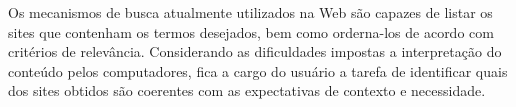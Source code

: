 
Os mecanismos de busca atualmente utilizados na Web são capazes de listar os sites que contenham os termos desejados, bem como orderna-los de acordo com critérios de relevância. Considerando as dificuldades impostas a interpretação do conteúdo pelos computadores, fica a cargo do usuário a tarefa de identificar quais dos sites obtidos são coerentes com as expectativas de contexto e necessidade.











